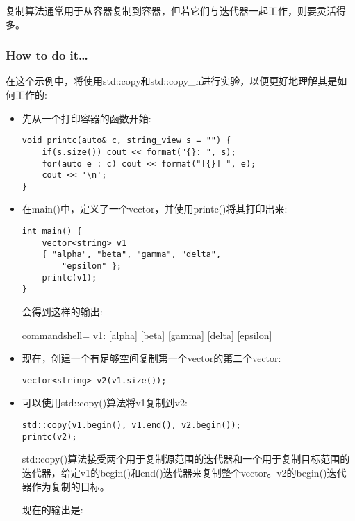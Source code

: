 
复制算法通常用于从容器复制到容器，但若它们与迭代器一起工作，则要灵活得多。


\subsubsection{How to do it…}

在这个示例中，将使用std::copy和std::copy\_n进行实验，以便更好地理解其是如何工作的:

\begin{itemize}
\item 
先从一个打印容器的函数开始:

\begin{lstlisting}[style=styleCXX]
void printc(auto& c, string_view s = "") {
	if(s.size()) cout << format("{}: ", s);
	for(auto e : c) cout << format("[{}] ", e);
	cout << '\n';
}
\end{lstlisting}

\item 
在main()中，定义了一个vector，并使用printc()将其打印出来:

\begin{lstlisting}[style=styleCXX]
int main() {
	vector<string> v1
	{ "alpha", "beta", "gamma", "delta",
		"epsilon" };
	printc(v1);
}
\end{lstlisting}

会得到这样的输出:

\begin{tcblisting}{commandshell={}}
v1: [alpha] [beta] [gamma] [delta] [epsilon]
\end{tcblisting}

\item 
现在，创建一个有足够空间复制第一个vector的第二个vector:

\begin{lstlisting}[style=styleCXX]
vector<string> v2(v1.size());
\end{lstlisting}

\item 
可以使用std::copy()算法将v1复制到v2:

\begin{lstlisting}[style=styleCXX]
std::copy(v1.begin(), v1.end(), v2.begin());
printc(v2);
\end{lstlisting}

std::copy()算法接受两个用于复制源范围的迭代器和一个用于复制目标范围的迭代器，给定v1的begin()和end()迭代器来复制整个vector。v2的begin()迭代器作为复制的目标。

现在的输出是:


\end{itemize}
